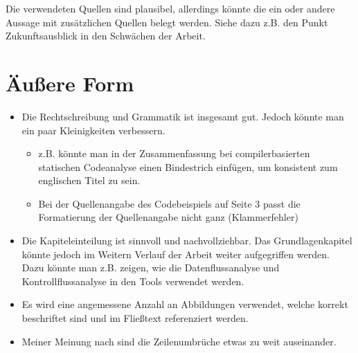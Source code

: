 \documentclass[a4paper,DIV=16]{scrartcl}
\begin{document}
  Die verwendeten Quellen sind plausibel, allerdings könnte die ein oder andere
  Aussage mit zusätzlichen Quellen belegt werden. Siehe dazu z.B. den Punkt
  Zukunftsausblick in den Schwächen der Arbeit.

\section*{Äußere Form}
\begin{itemize}
  \item Die Rechtschreibung und Grammatik ist insgesamt gut. Jedoch könnte man
  ein paar Kleinigkeiten verbessern.
  \begin{itemize}
   \item z.B. könnte man in der Zusammenfassung bei compilerbasierten statischen
    Codeanalyse einen Bindestrich einfügen, um konsistent zum englischen Titel
    zu sein. 
    \item Bei der Quellenangabe des Codebeispiels auf Seite 3 passt die
  Formatierung der Quellenangabe nicht ganz (Klammerfehler)
  \end{itemize}
  \item Die Kapiteleinteilung ist sinnvoll und nachvollziehbar. Das
  Grundlagenkapitel könnte jedoch im Weitern Verlauf der Arbeit weiter
  aufgegriffen werden. Dazu könnte man z.B. zeigen, wie die Datenflussanalyse und
  Kontrollflussanalyse in den Tools verwendet werden.
  \item Es wird eine angemessene Anzahl an Abbildungen verwendet, welche korrekt
  beschriftet sind und im Fließtext referenziert werden.
  \item Meiner Meinung nach sind die Zeilenumbrüche etwas zu weit auseinander.
\end{itemize}
\end{document}

